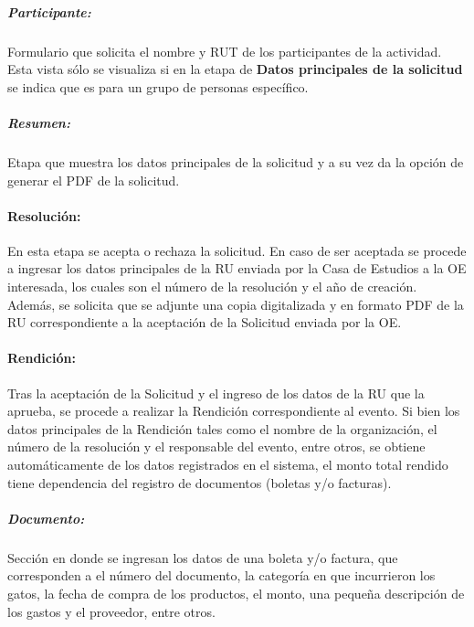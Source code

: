     \subparagraph{\emph{Participante: }} Formulario que solicita el nombre y RUT de los participantes de la actividad. Esta vista sólo se visualiza si en la etapa de \textbf{Datos principales de la solicitud} se indica que es para un grupo de personas específico. 

    \subparagraph{\emph{Resumen: }} Etapa que muestra los datos principales de la solicitud y a su vez da la opción de generar el PDF de la solicitud.

\paragraph{Resolución: } En esta etapa se acepta o rechaza la solicitud. En caso de ser aceptada se procede a ingresar los datos principales de la RU enviada por la Casa de Estudios a la OE interesada, los cuales son el número de la resolución y el año de creación. Además, se solicita que se adjunte una copia digitalizada y en formato PDF de la RU correspondiente a la aceptación de la Solicitud enviada por la OE.

\paragraph{Rendición: } Tras la aceptación de la Solicitud y el ingreso de los datos de la RU que la aprueba, se procede a realizar la Rendición correspondiente al evento. Si bien los datos principales de la Rendición tales como el nombre de la organización, el número de la resolución y el responsable del evento, entre otros, se obtiene automáticamente de los datos registrados en el sistema, el monto total rendido tiene dependencia del registro de documentos (boletas y/o facturas).

    \subparagraph{\emph{Documento: }} Sección en donde se ingresan los datos de una boleta y/o factura, que corresponden a el número del documento, la categoría en que incurrieron los gatos, la fecha de compra de los productos, el monto, una pequeña descripción de los gastos y el proveedor, entre otros.




